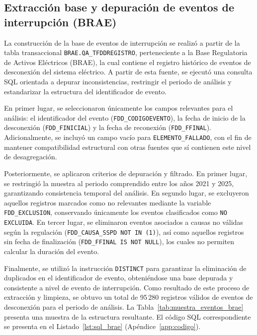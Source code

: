 \subsection{Extracción base y depuración de eventos de interrupción (BRAE)}
\label{sec:extraccion_brae}
La construcción de la base de eventos de interrupción se realizó a partir de la tabla transaccional \texttt{BRAE.QA\_TFDDREGISTRO}, perteneciente a la Base Regulatoria de Activos Eléctricos (BRAE), la cual contiene el registro histórico de eventos de desconexión del sistema eléctrico. A partir de esta fuente, se ejecutó una consulta SQL orientada a depurar inconsistencias, restringir el periodo de análisis y estandarizar la estructura del identificador de evento.

En primer lugar, se seleccionaron únicamente los campos relevantes para el análisis: el identificador del evento (\texttt{FDD\_CODIGOEVENTO}), la fecha de inicio de la desconexión (\texttt{FDD\_FINICIAL}) y la fecha de reconexión (\texttt{FDD\_FFINAL}). Adicionalmente, se incluyó un campo vacío para \texttt{ELEMENTO\_FALLADO}, con el fin de mantener compatibilidad estructural con otras fuentes que sí contienen este nivel de desagregación.

Posteriormente, se aplicaron criterios de depuración y filtrado. En primer lugar, se restringió la muestra al periodo comprendido entre los años 2021 y 2025, garantizando consistencia temporal del análisis. En segundo lugar, se excluyeron aquellos registros marcados como no relevantes mediante la variable \texttt{FDD\_EXCLUSION}, conservando únicamente los eventos clasificados como \texttt{NO EXCLUIDA}. En tercer lugar, se eliminaron eventos asociados a causas no válidas según la regulación (\texttt{FDD\_CAUSA\_SSPD NOT IN (1)}), así como aquellos registros sin fecha de finalización (\texttt{FDD\_FFINAL IS NOT NULL}), los cuales no permiten calcular la duración del evento.

    Finalmente, se utilizó la instrucción \texttt{DISTINCT} para garantizar la eliminación de duplicados en el identificador de evento, obteniéndose una base depurada y consistente a nivel de evento de interrupción. Como resultado de este proceso de extracción y limpieza, se obtuvo un total de 95\,280 registros válidos de eventos de desconexión para el periodo de análisis. La Tabla~\ref{tab:muestra_eventos_brae} presenta una muestra de la estructura resultante. El código SQL correspondiente se presenta en el Listado~\ref{lst:sql_brae} (Apéndice~\ref{app:codigo}).

